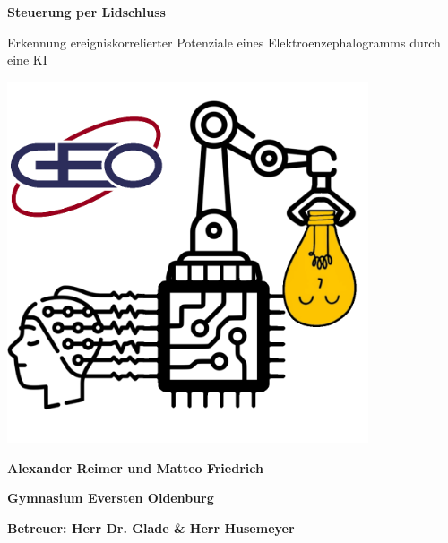\documentclass[11pt]{scrartcl}
\begin{document}


	\newcommand{\sig}{\textrm{sig}}
	\newcommand{\netin}{\textrm{netzinput}}

	\newcommand{\threesub}[1]{
		\vspace{1.5ex}
		\noindent {\textbf{#1}}
		\vspace{0.5ex}
	}

	\newcommand{\form}[1]{#1}

	\newcommand{\fig}[1]{\centering #1}

	\newcommand{\filepath}[1]{\texttt{#1}}
	\newcommand{\cmd}[1]{\texttt{#1}}

	\newcommand{\ownurl}[1]{\texttt{#1}}


	\renewcommand*{\arraystretch}{1.2}


	\thispagestyle{empty}

	\vspace*{10mm}
	{
		\begin{center}
			\Huge \textbf{Steuerung per Lidschluss}

			Erkennung ereigniskorrelierter Potenziale eines Elektroenzephalogramms durch eine KI
			\vspace*{10mm}
		\end{center}


		\begin{center}
		
			\includegraphics[width=0.8\textwidth]{pictures/logo.png}
		
			\vspace{15mm}
		
			{\huge \textbf{Alexander Reimer und Matteo Friedrich}}
		
			\vspace{1em}
		
			{\LARGE \textbf{Gymnasium Eversten Oldenburg}}
		
			\vspace{2em}
		
			\textbf{\Large Betreuer: Herr Dr. Glade \& Herr Husemeyer}
		\end{center}
	}
\end{document}
